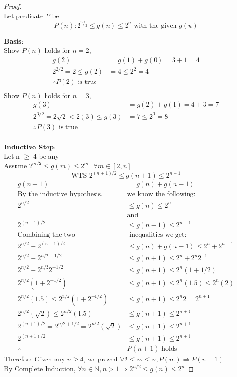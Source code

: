 \documentclass[11pt]{article}
\theoremstyle{plain}%
\theoremstyle{definition}
\theoremstyle{remark}
\newcommand*\rfrac[2]{{}^{#1}\!/_{#2}}
\begin{document}
\begin{proof}
  $ $ \\

  Let predicate $P$ be
  \[
    P(n): 2^{\rfrac{n}{2}} \leq g(n) \leq 2^n \text{ with the given } g(n)
  \]

  \textbf{Basis}:\\
  Show $P(n)$ holds for $n=2$,
  \begin{align*}
  g(2) &= g(1) + g(0) = 3 + 1 = 4\\
  2^{2/2} = 2 \le g(2) &= 4 \le 2^2 = 4\\
  \therefore P(2) \text{ is true }\\
  \end{align*}
  Show $P(n)$ holds for $n=3$,
  \begin{align*}
  g(3) &= g(2) + g(1) = 4 + 3 = 7\\
  2^{3/2} = 2\sqrt{2} < 2(3) \le g(3) &= 7 \le 2^3 = 8\\
  \therefore P(3) \text{ is true }\\
  \end{align*}

  \vskip 10pt
  \textbf{Inductive Step}:\\
  Let n $\ge$ 4 be any\\
  Assume  $2^{m/2} \le g(m) \le 2^{m} \text{ } \forall m \in [2,n]$ \\
  $$\text{WTS }2^{(n+1)/2} \le g(n+1) \le 2^{n+1}$$
  \begin{align*}
  g(n+1) &= g(n) + g(n-1)\\
  \text{By the inductive hypothesis, }&\text{we know the following:}\\
  2^{n/2} &\le g(n) \le 2^{n}\\
  &\text{and}\\
  2^{(n-1)/2} &\le g(n-1) \le 2^{n-1}\\
  \text{Combining the two } & \text{ inequalities we get:}\\
  2^{n/2} + 2^{(n-1)/2}&\le g(n) + g(n-1)\le 2^n + 2^{n-1}\\
  2^{n/2} + 2^{n/2-1/2}&\le g(n+1)\le 2^n + 2^{n}2^{-1}\\
  2^{n/2} + 2^{n/2}2^{-1/2}&\le g(n+1)\le 2^n(1+1/2)\\
  2^{n/2}(1+2^{-1/2})&\le g(n+1)\le 2^n(1.5) \le 2^n(2)\\
  2^{n/2}(1.5)\le 2^{n/2}(1+2^{-1/2})&\le g(n+1)\le 2^n2=2^{n+1}\\
  2^{n/2}(\sqrt{2})\le 2^{n/2}(1.5) &\le g(n+1)\le 2^{n+1}\\
  2^{(n+1)/2}= 2^{n/2 + 1/2} = 2^{n/2}(\sqrt{2}) &\le g(n+1)\le 2^{n+1}\\
  2^{(n+1)/2} &\le g(n+1) \le 2^{n+1}\\
  \therefore &P(n+1) \text{ holds }
  \end{align*}
  Therefore Given any $n\geq 4$, we proved $\forall 2\leq m \leq n, P(m) \Rightarrow P(n+1)$. \\
  By Complete Induction, $\forall n \in \mathbb{N}, n>1 \Rightarrow 2^{n/2} \le g(n) \le 2^n $

\end{proof}
\end{document}
